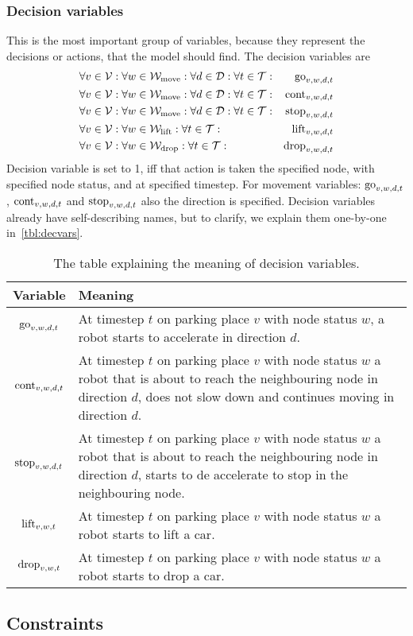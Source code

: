 \subsubsection{Decision variables}
This is the most important group of variables, because they represent the
decisions or actions, that the model should find. The decision variables are
\begin{align}
    &\forall v \in \mathcal{V}: \forall w \in \mathcal{W}_\mathrm{move}: \forall d \in \mathcal{D}: \forall t \in \mathcal{T}: &
    \mathrm{go}_{v,w,d,t}\\
    &\forall v \in \mathcal{V}: \forall w \in \mathcal{W}_\mathrm{move}: \forall d \in \mathcal{D}: \forall t \in \mathcal{T}: &
    \mathrm{cont}_{v,w,d,t}\\
    &\forall v \in \mathcal{V}: \forall w \in \mathcal{W}_\mathrm{move}: \forall d \in \mathcal{D}: \forall t \in \mathcal{T}: &
    \mathrm{stop}_{v,w,d,t}\\
    &\forall v \in \mathcal{V}: \forall w \in \mathcal{W}_\mathrm{lift}: \forall t \in \mathcal{T}: &
    \mathrm{lift}_{v,w,d,t}\\
    &\forall v \in \mathcal{V}: \forall w \in \mathcal{W}_\mathrm{drop}: \forall t \in \mathcal{T}: &
    \mathrm{drop}_{v,w,d,t}
\end{align}
Decision variable is set to 1, iff that action is taken the specified node, with
specified node status, and at specified timestep. For movement variables:
$\mathrm{go}_{v,w,d,t}$, $\mathrm{cont}_{v,w,d,t}$ and $\mathrm{stop}_{v,w,d,t}$ also the direction is
specified. Decision variables already have self-describing names, but to
clarify, we explain them one-by-one in~\autoref{tbl:decvars}.

\begin{table}
    \center
    \begin{tabular}{| c | p{\textwidth - 2.6cm} |}
        \hline
        Variable & Meaning\\
        \hline
        $\mathrm{go}_{v,w,d,t}$ & At timestep $t$ on parking place $v$ with node status
        $w$, a robot starts to accelerate in direction $d$.\\ \hline
        $\mathrm{cont}_{v,w,d,t}$ & At timestep $t$ on parking place $v$ with node status
        $w$ a robot that is about to reach the neighbouring node in direction
        $d$, does not slow down and continues moving in direction $d$.\\ \hline
        $\mathrm{stop}_{v,w,d,t}$ & At timestep $t$ on parking place $v$ with node status
        $w$ a robot that is about to reach the neighbouring node in direction
        $d$, starts to de accelerate to stop in the neighbouring node.\\ \hline
        $\mathrm{lift}_{v,w,t}$ & At timestep $t$ on parking place $v$ with node status
        $w$ a robot starts to lift a car.\\ \hline
        $\mathrm{drop}_{v,w,t}$ & At timestep $t$ on parking place $v$ with node status
        $w$ a robot starts to drop a car.\\
        \hline
    \end{tabular}
    \caption{The table explaining the meaning of decision variables.}
    \label{tbl:decvars}
\end{table}

\subsection{Constraints}
